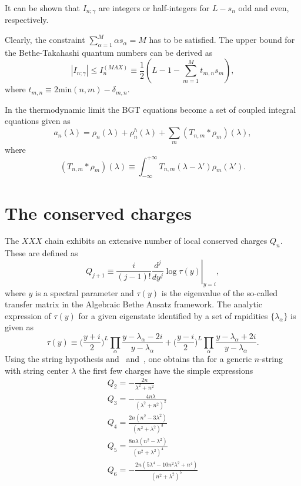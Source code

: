 \documentclass[11pt]{iopart}
\begin{document}
It can be shown that $I_{n;\gamma}$  are integers or half-integers for $L-s_n$ 
odd and even, respectively. 


Clearly, the constraint $\sum_{\alpha=1}^{M}\alpha s_\alpha=M$ 
has to be satisfied. The upper bound for the Bethe-Takahashi quantum numbers 
can be derived as   
%
\begin{equation}
|I_{n;\gamma}|\le I^{(MAX)}_{n}\equiv\frac{1}{2}(L-1-\sum
\limits_{m=1}^Mt_{m,n}s_m),
\label{bt_qn_bound}
\end{equation}
%
where $t_{m,n}\equiv 2\mbox{min}(n,m)-\delta_{m,n}$. 

In the thermodynamic limit the BGT equations become a set of coupled integral 
equations given as 
%
\begin{equation}
\label{bgt-th}
a_n(\lambda)=\rho_n(\lambda)+\rho^h_n(\lambda)+\sum_m(T_{n,m}*\rho_m)
(\lambda),
\end{equation}
%
where 
%
\begin{equation}
(T_{n,m}*\rho_m)(\lambda)\equiv\int_{-\infty}^{+\infty}T_{n,m}(\lambda-\lambda')
\rho_{m}(\lambda'). 
\end{equation}
%



\section{The conserved charges}

The $XXX$ chain exhibits an extensive number of local conserved charges $Q_n$. 
These are defined as 
%
\begin{equation}
\label{Q-def}
\left.Q_{j+1}\equiv\frac{i}{(j-1)!}\frac{d^j}{dy^j}\log\tau
(y)\right|_{y=i},
\end{equation}
%
where $y$ is a spectral parameter and $\tau(y)$ is the eigenvalue of the 
so-called transfer matrix in the Algebraic Bethe Ansatz framework. The 
analytic expression of $\tau(y)$ for a given eigenstate identified by 
a set of rapidities $\{\lambda_\alpha\}$ is given as 
%
\begin{equation}
\label{tau}
\tau(y)\equiv\Big(\frac{y+i}{2}\Big)^L\prod\limits_\alpha\frac{y-\lambda_\alpha-2i}
{y-\lambda_\alpha}+\Big(\frac{y-i}{2}\Big)^L\prod\limits_\alpha\frac{y-\lambda_\alpha
+2i}{y-\lambda_\alpha}.
\end{equation}
%
Using the string hypothesis and~ and~, one obtains tha for 
a generic $n$-string with string center $\lambda$ the first few charges have the 
simple expressions
%
\begin{eqnarray}
Q_2=-\frac{2n}{\lambda^2+n^2}\\
Q_3=-\frac{4n\lambda}{(\lambda^2+n^2)^2}\\
Q_4=\frac{2n(n^2-3\lambda^2)}{(n^2+\lambda^2)^3}\\
Q_5=\frac{8n\lambda(n^2-\lambda^2)}{(n^2+\lambda^2)^4}\\
Q_6=-\frac{2n(5\lambda^4-10n^2\lambda^2+n^4)}{(n^2+\lambda^2)^5}
\end{eqnarray}
%
\end{document}
